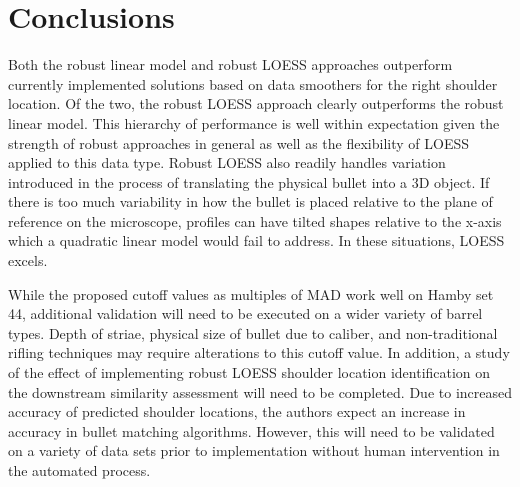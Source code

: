 \documentclass[12pt]{article}
\begin{document}
\section{Conclusions}

Both the robust linear model and robust LOESS approaches outperform
currently implemented solutions based on data smoothers for the right
shoulder location. Of the two, the robust LOESS approach clearly
outperforms the robust linear model. This hierarchy of performance is
well within expectation given the strength of robust approaches in
general as well as the flexibility of LOESS applied to this data type.
Robust LOESS also readily handles variation introduced in the process of
translating the physical bullet into a 3D object. If there is too much
variability in how the bullet is placed relative to the plane of
reference on the microscope, profiles can have tilted shapes relative to
the x-axis which a quadratic linear model would fail to address. In
these situations, LOESS excels.

While the proposed cutoff values as multiples of MAD work well on Hamby
set 44, additional validation will need to be executed on a wider
variety of barrel types. Depth of striae, physical size of bullet due to
caliber, and non-traditional rifling techniques may require alterations
to this cutoff value. In addition, a study of the effect of implementing
robust LOESS shoulder location identification on the downstream
similarity assessment will need to be completed. Due to increased
accuracy of predicted shoulder locations, the authors expect an increase
in accuracy in bullet matching algorithms. However, this will need to be
validated on a variety of data sets prior to implementation without
human intervention in the automated process.



\end{document}
